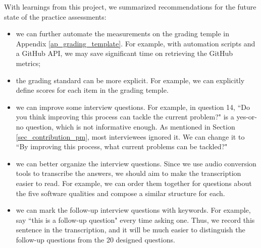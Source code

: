 With learnings from this project, we summarized recommendations for the future state of the practice assessments:
\begin{itemize}
	\item we can further automate the measurements on the grading temple in Appendix \ref{ap_grading_template}. For example, with automation scripts and a GitHub API, we may save significant time on retrieving the GitHub metrics;
	\item the grading standard can be more explicit. For example, we can explicitly define scores for each item in the grading temple.
	\item we can improve some interview questions. For example, in question 14, ``Do you think improving this process can tackle the current problem?" is a yes-or-no question, which is not informative enough. As mentioned in Section \ref{sec_contribution_pm}, most interviewees ignored it. We can change it to ``By improving this process, what current problems can be tackled?"
	\item we can better organize the interview questions. Since we use audio conversion tools to transcribe the answers, we should aim to make the transcription easier to read. For example, we can order them together for questions about the five software qualities and compose a similar structure for each.
	\item we can mark the follow-up interview questions with keywords. For example, say ``this is a follow-up question" every time asking one. Thus, we record this sentence in the transcription, and it will be much easier to distinguish the follow-up questions from the 20 designed questions.
\end{itemize}

